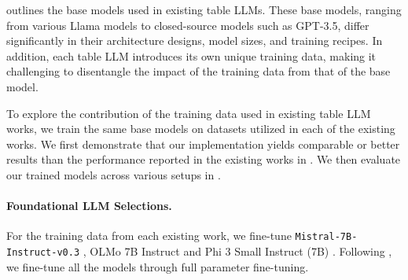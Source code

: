 \documentclass[11pt]{article}
\newcommand{\shuaichen}[1]{\textcolor{orange}{[shuaichen: #1]}}
\begin{document}

 outlines the base models used in existing table LLMs. 
These base models, ranging from various Llama models to closed-source models such as GPT-3.5, differ significantly in their architecture designs, model sizes, and training recipes.
In addition, each table LLM introduces its own unique training data, making it challenging to disentangle the impact of the training data from that of the base model.

To explore the contribution of the training data used in existing table LLM works, we train the same base models on datasets utilized in each of the existing works.
We first demonstrate that our implementation yields comparable or better results than the performance reported in the existing works in . We then evaluate our trained models across various setups in .


\paragraph{Foundational LLM Selections.}
For the training data from each existing work, we fine-tune \texttt{Mistral-7B-Instruct-v0.3} \citep{jiang2023mistral}, OLMo 7B Instruct \citep{groeneveld2024olmo} and Phi 3 Small Instruct (7B) \citep{abdin2024phi}.
Following \citet{zhang-etal-2024-tablellama, zhang2024tablellm, wu2024tablebenchcomprehensivecomplexbenchmark}, we fine-tune all the models through full parameter fine-tuning.
\end{document}
